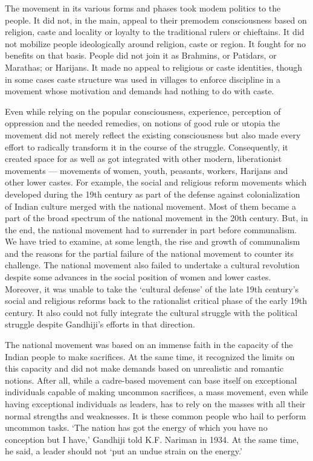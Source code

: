 The movement in its various forms and phases took modem politics to the people. It did not, in the main, appeal to their pre­modem consciousness based on religion, caste and locality or loyalty to the traditional rulers or chieftains. It did not mobilize people ideologically around religion, caste or region. It fought for no benefits on that basis. People did not join it as Brahmins, or Patidars, or Marathas; or Harijans. It made no appeal to religious or caste identities, though in some cases caste structure was used in villages to enforce discipline in a movement whose motivation and demands had nothing to do with caste.

Even while relying on the popular consciousness, experience, perception of oppression and the needed remedies, on notions of good rule or utopia the movement did not merely reflect the existing consciousness but also made every effort to radically transform it in the course of the struggle. Consequently, it created space for as well as got integrated with other modern, liberationist movements — movements of women, youth, peasants, workers, Harijans and other lower castes. For example, the social and religious reform movements which developed during the 19th century as part of the defense against colonialization of Indian culture merged with the national movement. Most of them became a part of the broad spectrum of the national movement in the 20th century. But, in the end, the national movement had to surrender in part before communalism. We have tried to examine, at some length, the rise and growth of communalism and the reasons for the partial failure of the national movement to counter its challenge. The national movement also failed to undertake a cultural revolution despite some advances in the social position of women and lower castes. Moreover, it was unable to take the `cultural defense' of the late 19th century's social and religious reforms back to the rationalist critical phase of the early 19th century. It also could not fully integrate the cultural struggle with the political struggle despite Gandhiji's efforts in that direction.

The national movement was based on an immense faith in the capacity of the Indian people to make sacrifices. At the same time, it recognized the limits on this capacity and did not make demands based on unrealistic and romantic notions. After all, while a cadre-based movement can base itself on exceptional individuals capable of making uncommon sacrifices, a mass movement, even while having exceptional individuals as leaders, has to rely on the masses with all their normal strengths and weaknesses. It is these common people who hail to perform uncommon tasks. `The nation has got the energy of which you have no conception but I have,' Gandhiji told K.F. Nariman in 1934. At the same time, he said, a leader should not `put an undue strain on the energy.'

